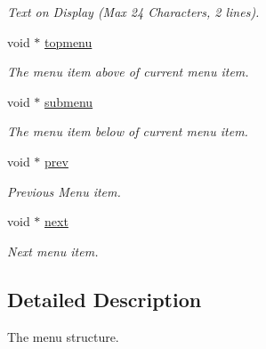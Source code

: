 \begin{CompactItemize}
\begin{CompactList}\small\item\em Text on Display (Max 24 Characters, 2 lines). \item\end{CompactList}\item 
\hypertarget{structmenu__entry__t_c0b6b7d88e004c1c64f99cae93d0f57e}{
void $\ast$ \hyperlink{structmenu__entry__t_c0b6b7d88e004c1c64f99cae93d0f57e}{topmenu}}
\label{structmenu__entry__t_c0b6b7d88e004c1c64f99cae93d0f57e}

\begin{CompactList}\small\item\em The menu item above of current menu item. \item\end{CompactList}\item 
\hypertarget{structmenu__entry__t_d325ca30c2993cd5496fcebac7a14085}{
void $\ast$ \hyperlink{structmenu__entry__t_d325ca30c2993cd5496fcebac7a14085}{submenu}}
\label{structmenu__entry__t_d325ca30c2993cd5496fcebac7a14085}

\begin{CompactList}\small\item\em The menu item below of current menu item. \item\end{CompactList}\item 
\hypertarget{structmenu__entry__t_a33ea894bce900b283a55202906d8d30}{
void $\ast$ \hyperlink{structmenu__entry__t_a33ea894bce900b283a55202906d8d30}{prev}}
\label{structmenu__entry__t_a33ea894bce900b283a55202906d8d30}

\begin{CompactList}\small\item\em Previous Menu item. \item\end{CompactList}\item 
\hypertarget{structmenu__entry__t_e058b44f1f4805e1e9cf58ac9c8c684d}{
void $\ast$ \hyperlink{structmenu__entry__t_e058b44f1f4805e1e9cf58ac9c8c684d}{next}}
\label{structmenu__entry__t_e058b44f1f4805e1e9cf58ac9c8c684d}

\begin{CompactList}\small\item\em Next menu item. \item\end{CompactList}\end{CompactItemize}


\subsection{Detailed Description}
The menu structure. 


